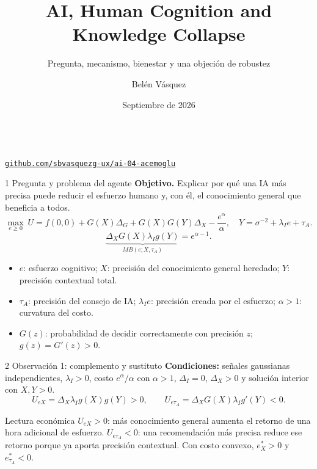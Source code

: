 \documentclass[aspectratio=169,11pt]{beamer}
\title[AKO (2026): auditoría]{AI, Human Cognition and Knowledge Collapse}
\subtitle{Pregunta, mecanismo, bienestar y una objeción de robustez}
\author{Belén Vásquez}\institute{Universidad del Pacífico}\date{Septiembre de 2026}
\begin{document}
\begin{frame}[plain]\titlepage\vspace{-1em}\begin{center}\small\paperref\\[.4em]\href{\RepoURL}{\texttt{github.com/sbvasquezg-ux/ai-04-acemoglu}}\end{center}\end{frame}

\begin{frame}{1 \textperiodcentered{} Pregunta y problema del agente}
\footnotesize
\textbf{Objetivo.} Explicar por qué una IA más precisa puede reducir el esfuerzo humano y, con él, el conocimiento general que beneficia a todos.
\[
\max_{e\ge0}\ U=f(0,0)+G(X)\Delta_G+G(X)G(Y)\Delta_X-\frac{e^\alpha}{\alpha},
\quad Y=\sigma^{-2}+\lambda_Ie+\tau_A.
\]
\[
\underbrace{\Delta_XG(X)\lambda_Ig(Y)}_{MB(e;X,\tau_A)}=e^{\alpha-1}.
\]
\begin{itemize}\item $e$: esfuerzo cognitivo; $X$: precisión del conocimiento general heredado; $Y$: precisión contextual total.
\item $\tau_A$: precisión del consejo de IA; $\lambda_Ie$: precisión creada por el esfuerzo; $\alpha>1$: curvatura del costo.
\item $G(z)$: probabilidad de decidir correctamente con precisión $z$; $g(z)=G'(z)>0$.
\end{itemize}
\end{frame}

\begin{frame}{2 \textperiodcentered{} Observación 1: complemento y sustituto}
\footnotesize
\textbf{Condiciones:} señales gaussianas independientes, $\lambda_I>0$, costo $e^\alpha/\alpha$ con $\alpha>1$, $\Delta_I=0$, $\Delta_X>0$ y solución interior con $X,Y>0$.
\[
U_{eX}=\Delta_X\lambda_Ig(X)g(Y)>0,
\qquad U_{e\tau_A}=\Delta_XG(X)\lambda_Ig'(Y)<0.
\]
\begin{block}{Lectura económica}
$U_{eX}>0$: más conocimiento general aumenta el retorno de una hora adicional de esfuerzo. $U_{e\tau_A}<0$: una recomendación más precisa reduce ese retorno porque ya aporta precisión contextual. Con costo convexo, $e_X^*>0$ y $e_{\tau_A}^*<0$.
\end{block}
\end{frame}
\end{document}

